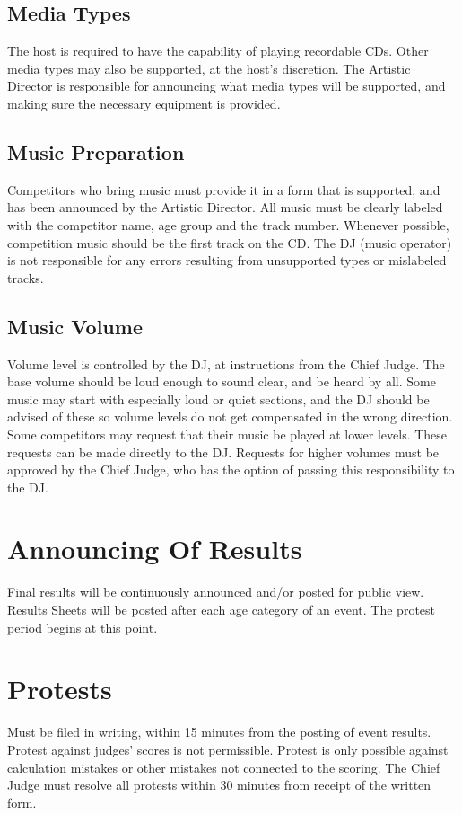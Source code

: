 \subsection{Media Types}
The host is required to have the capability of playing recordable CDs. Other media types may also be supported, at the host's discretion. The Artistic Director is responsible for announcing what media types will be supported, and making sure the necessary equipment is provided.
\subsection{Music Preparation }
Competitors who bring music must provide it in a form that is supported, and has been announced by the Artistic Director. All music must be clearly labeled with the competitor name, age group and the track number. Whenever possible, competition music should be the first track on the CD. The DJ (music operator) is not responsible for any errors resulting from unsupported types or mislabeled tracks.
\subsection{Music Volume}
Volume level is controlled by the DJ, at instructions from the Chief Judge. The base volume should be loud enough to sound clear, and be heard by all. Some music may start with especially loud or quiet sections, and the DJ should be advised of these so volume levels do not get compensated in the wrong direction. Some competitors may request that their music be played at lower levels. These requests can be made directly to the DJ. Requests for higher volumes must be approved by the Chief Judge, who has the option of passing this responsibility to the DJ.
\section{Announcing Of Results}
Final results will be continuously announced and/or posted for public view. Results Sheets will be posted after each age category of an event. The protest period begins at this point.
\section{Protests}
Must be filed in writing, within 15 minutes from the posting of event results. Protest against judges’ scores is not permissible. Protest is only possible against calculation mistakes or other mistakes not connected to the scoring. The Chief Judge must resolve all protests within 30 minutes from receipt of the written form.
